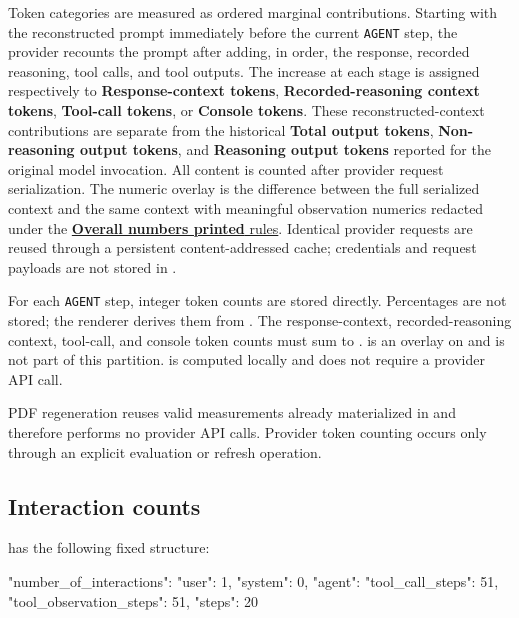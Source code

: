\documentclass[11pt]{article}
\begin{document}
Token categories are measured as ordered marginal contributions.
Starting with the reconstructed prompt immediately before the current \texttt{AGENT} step, the provider recounts the prompt after adding, in order, the response, recorded reasoning, tool calls, and tool outputs.
The increase at each stage is assigned respectively to \textbf{Response-context tokens}, \textbf{Recorded-reasoning context tokens}, \textbf{Tool-call tokens}, or \textbf{Console tokens}.
These reconstructed-context contributions are separate from the historical \textbf{Total output tokens}, \textbf{Non-reasoning output tokens}, and \textbf{Reasoning output tokens} reported for the original model invocation.
All content is counted after provider request serialization.
The numeric overlay is the difference between the full serialized context and the same context with meaningful observation numerics redacted under the \hyperref[metric:overall-numbers-printed]{\textbf{Overall numbers printed} rules}.
Identical provider requests are reused through a persistent content-addressed cache; credentials and request payloads are not stored in .

For each \texttt{AGENT} step, integer token counts are stored directly.
Percentages are not stored; the renderer derives them from .
The response-context, recorded-reasoning context, tool-call, and console token counts must sum to .
 is an overlay on  and is not part of this partition.
 is computed locally and does not require a provider API call.

PDF regeneration reuses valid measurements already materialized in  and therefore performs no provider API calls.
Provider token counting occurs only through an explicit evaluation or refresh operation.

\subsection*{Interaction counts}
\label{sec:trajectory-evaluation-number-of-interactions}

 has the following fixed structure:
\begin{DocCode}
{
  "number_of_interactions": {
    "user": 1,
    "system": 0,
    "agent": {
      "tool_call_steps": 51,
      "tool_observation_steps": 51,
      "steps": 20
    }
  }
}
\end{DocCode}
\end{document}
